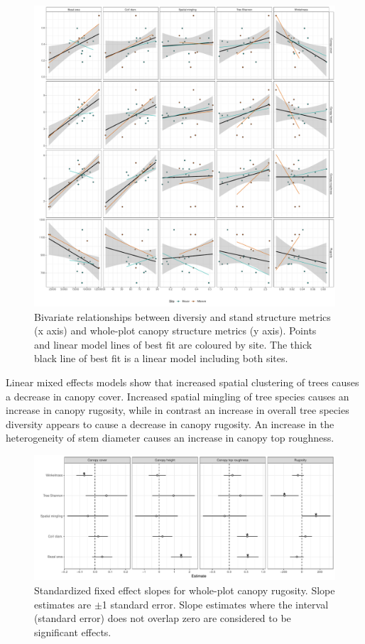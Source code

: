 \documentclass[11pt,a4paper]{article}
\begin{document}
\begin{figure}[H]
	\includegraphics[width=\textwidth]{canopy_rough_mod_bivar}
	\caption{Bivariate relationships between diversiy and stand structure metrics (x axis) and whole-plot canopy structure metrics (y axis). Points and linear model lines of best fit are coloured by site. The thick black line of best fit is a linear model including both sites.}
	\label{canopy_rough_mod_bivar}
\end{figure}

Linear mixed effects models show that increased spatial clustering of trees causes a decrease in canopy cover. Increased spatial mingling of tree species causes an increase in canopy rugosity, while in contrast an increase in overall tree species diversity appears to cause a decrease in canopy rugosity. An increase in the heterogeneity of stem diameter causes an increase in canopy top roughness.

\begin{figure}[H]
	\includegraphics[width=\textwidth]{canopy_rough_slopes}
	\caption{Standardized fixed effect slopes for whole-plot canopy rugosity. Slope estimates are $\pm$1 standard error. Slope estimates where the interval (standard error) does not overlap zero are considered to be significant effects.}
	\label{canopy_rough_slopes}
\end{figure}
\end{document}
